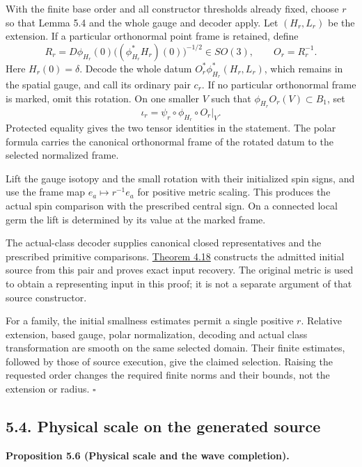\documentclass[
  english,
  11pt,
  reqno]{amsart}
\makeatletter
\newcommand{\paperdisplaynext}{%
  \let\paper@savedstartsection\@startsection
  \def\@startsection##1##2##3##4##5##6{%
    \let\@startsection\paper@savedstartsection
    \@tempskipa ##5\relax
    \ifdim\@tempskipa<\z@
      \def\paper@afterskip{.35\baselineskip}%
    \else
      \def\paper@afterskip{##5}%
    \fi
    \@startsection{##1}{##2}{##3}{##4}{\paper@afterskip}{##6}}}
\newcommand{\paperdisplaysection}{\paperdisplaynext\subsection}
\newcommand{\pandocstatementheading}[1]{%
  \par\if@nobreak\else
    \addpenalty{\@beginparpenalty}%
    \addvspace{.5\baselineskip plus .2\baselineskip minus .2\baselineskip}%
  \fi
  {\normalfont\bfseries #1\par}%
  \nobreak\@afterindenttrue\@afterheading
}
\let\paper@displaysection\paperdisplaysection
\renewcommand{\paperdisplaysection}[1]{%
  \let\paper@savedhangfrom\@hangfrom
  \long\def\@hangfrom##1##2{%
    \paper@savedhangfrom{##1}{\paper@headingparagraph##2}}%
  \paper@displaysection{#1}%
  \let\@hangfrom\paper@savedhangfrom}
\makeatother
\begin{document}
With the finite base order and all constructor thresholds already fixed,
choose \(r\) so that Lemma 5.4 and the whole gauge and decoder apply.
Let \((H_r,L_r)\) be the extension. If a particular orthonormal point
frame is retained, define%
 \[
R_r
=
D\phi_{H_r}(0)
\bigl((\phi_{H_r}^*H_r)(0)\bigr)^{-1/2}\in SO(3),
\qquad
O_r=R_r^{-1}.
\] Here \(H_r(0)=\delta\). Decode the whole datum
\(O_r^*\phi_{H_r}^*(H_r,L_r)\), which remains in the spatial gauge, and
call its ordinary pair \(c_r\). If no particular orthonormal frame is
marked, omit this rotation. On one smaller \(V\) such that
\(\phi_{H_r}O_r(V)\subset B_1\), set%
 \[
\iota_r
=
\psi_r\circ\phi_{H_r}\circ O_r|_V.
\] Protected equality gives the two tensor identities in the statement.
The polar formula carries the canonical orthonormal frame of the rotated
datum to the selected normalized frame.

Lift the gauge isotopy and the small rotation with their initialized
spin signs, and use the frame map \(e_a\mapsto r^{-1}e_a\) for positive
metric scaling. This produces the actual spin comparison with the
prescribed central sign. On a connected local germ the lift is
determined by its value at the marked frame.

The actual-class decoder supplies canonical closed representatives and
the prescribed primitive comparisons.
\hyperref[thm:online-ordinary-negative-response-initial-source]{Theorem
4.18} constructs the admitted initial source from this pair and proves
exact input recovery. The original metric is used to obtain a
representing input in this proof; it is not a separate argument of that
source constructor.

For a family, the initial smallness estimates permit a single positive
\(r\). Relative extension, based gauge, polar normalization, decoding
and actual class transformation are smooth on the same selected domain.
Their finite estimates, followed by those of source execution, give the
claimed selection. Raising the requested order changes the required
finite norms and their bounds, not the extension or radius.
\hfill\(\square\)

\paperdisplaysection{5.4. Physical scale on the generated
source}\label{physical-scale-on-the-generated-source}\label{sec:submission-coverage-physical-scale}

\pandocstatementheading{\leavevmode{}\label{prop:submission-complete-source-physical-scale}Proposition 5.6 (Physical scale and the wave completion).}
\end{document}
